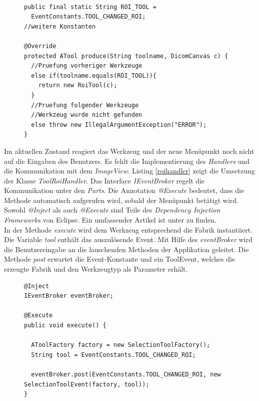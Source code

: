 \begin{figure}[htbp]
\begin{lstlisting}[frame=leftline]

public final static String ROI_TOOL = 
  EventConstants.TOOL_CHANGED_ROI;
//weitere Konstanten

@Override
protected ATool produce(String toolname, DicomCanvas c) {
  //Pruefung vorheriger Werkzeuge
  else if(toolname.equals(ROI_TOOL)){
    return new RoiTool(c);
  }
  //Pruefung folgender Werkzeuge
  //Werkzeug wurde nicht gefunden
  else throw new IllegalArgumentException("ERROR");
}
\end{lstlisting}
\end{figure}

Im aktuellen Zustand reagiert das Werkzeug und der neue Menüpunkt noch nicht auf die Eingaben des Benutzers. Es fehlt die Implementierung des \textit{Handlers} und die Kommunikation mit dem \textit{ImageView}. Listing \ref{roihandler} zeigt die Umsetzung der Klasse \textit{ToolRoiHandler}. Das Interface \textit{IEventBroker} regelt die Kommunikation unter den \textit{Parts}. Die Annotation \textit{@Execute} bedeutet, dass die Methode automatisch aufgerufen wird, sobald der Menüpunkt betätigt wird. Sowohl \textit{@Inject} als auch \textit{@Execute} sind Teile des \textit{Dependency Injection Frameworks} von Eclipse. Ein umfassender Artikel ist unter \cite{vogel:di} zu finden.\\
In der Methode \textit{execute} wird dem Werkzeug entsprechend die Fabrik instantiiert. Die Variable \textit{tool} enthält das auszulösende Event. Mit Hilfe des \textit{eventBroker} wird die Benutzereingabe an die lauschenden Methoden der Applikation geleitet. Die Methode \textit{post} erwartet die Event-Konstante und ein ToolEvent, welches die erzeugte Fabrik und den Werkzeugtyp als Parameter erhält.

\begin{figure}[htbp]
\begin{lstlisting}[frame=leftline]
@Inject
IEventBroker eventBroker;

@Execute
public void execute() {

  AToolFactory factory = new SelectionToolFactory();
  String tool = EventConstants.TOOL_CHANGED_ROI;

  eventBroker.post(EventConstants.TOOL_CHANGED_ROI, new SelectionToolEvent(factory, tool));
}
\end{lstlisting}
\end{figure}

